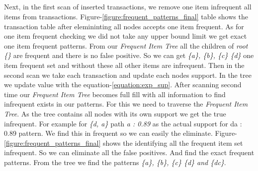 \subsection*{}
Next, in the first scan of inserted transactions, we remove one item infrequent all items from transactions. Figure-\ref{figure:frequent_patterns_final} table shows the transaction table after elemininting all nodes accepts one item frequent. As for one item frequent checking we did not take any upper bound limit we get exact one item frequent patterns. From our \emph{Frequent Item Tree} all the children of \emph{root \{\}} are frequent and there is no false positive. So we can get \emph{\{a\}, \{b\}, \{c\} \{d\}} one item frequent set and without these all other items are infrequent.  Then in the second scan we take each transaction and update each nodes support. In the tree we update value with the equation-\ref{equation:exp_sup}. After scanning second time our \emph{Frequent Item Tree} becomes full fill with all information to find infrequent exists in our patterns. For this we need to traverse the \emph{Frequent Item Tree}. As the tree contains all nodes with its own support we get the true infrequent. For example for \emph{\{d, a\}} path \emph{a : 0.89} as the actual support for {da : 0.89} pattern. We find this in frequent so we can easily the eliminate. Figure-\ref{figure:frequent_patterns_final} shows the identifying all the frequent item set infrequent. So we can eliminate all the false positives.	And find the exact frequent patterns. From the tree we find the patterns \emph{\{a\}, \{b\}, \{c\} \{d\} and \{dc\}}.

%